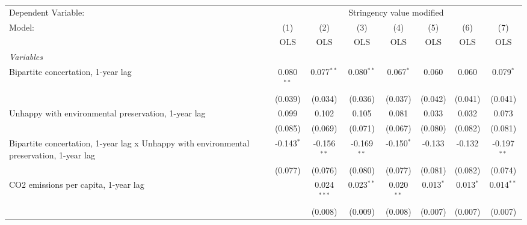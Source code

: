 
\begingroup
\centering
\begin{tabular}{lccccccc}
   \toprule
   Dependent Variable: & \multicolumn{7}{c}{Stringency value modified}\\
   Model:                                                                                   & (1)          & (2)           & (3)           & (4)           & (5)           & (6)           & (7)\\  
                                                                                            &  OLS         & OLS           & OLS           & OLS           & OLS           & OLS           & OLS\\  
   \midrule
   \emph{Variables}\\
   Bipartite concertation, 1-year lag                                                       & 0.080$^{**}$ & 0.077$^{**}$  & 0.080$^{**}$  & 0.067$^{*}$   & 0.060         & 0.060         & 0.079$^{*}$\\   
                                                                                            & (0.039)      & (0.034)       & (0.036)       & (0.037)       & (0.042)       & (0.041)       & (0.041)\\   
   Unhappy with environmental preservation, 1-year lag                                      & 0.099        & 0.102         & 0.105         & 0.081         & 0.033         & 0.032         & 0.073\\   
                                                                                            & (0.085)      & (0.069)       & (0.071)       & (0.067)       & (0.080)       & (0.082)       & (0.081)\\   
   Bipartite concertation, 1-year lag x Unhappy with environmental preservation, 1-year lag & -0.143$^{*}$ & -0.156$^{**}$ & -0.169$^{**}$ & -0.150$^{*}$  & -0.133        & -0.132        & -0.197$^{**}$\\   
                                                                                            & (0.077)      & (0.076)       & (0.080)       & (0.077)       & (0.081)       & (0.082)       & (0.074)\\   
   CO2 emissions per capita, 1-year lag                                                     &              & 0.024$^{***}$ & 0.023$^{**}$  & 0.020$^{**}$  & 0.013$^{*}$   & 0.013$^{*}$   & 0.014$^{**}$\\   
                                                                                            &              & (0.008)       & (0.009)       & (0.008)       & (0.007)       & (0.007)       & (0.007)\\   

\end{tabular}
